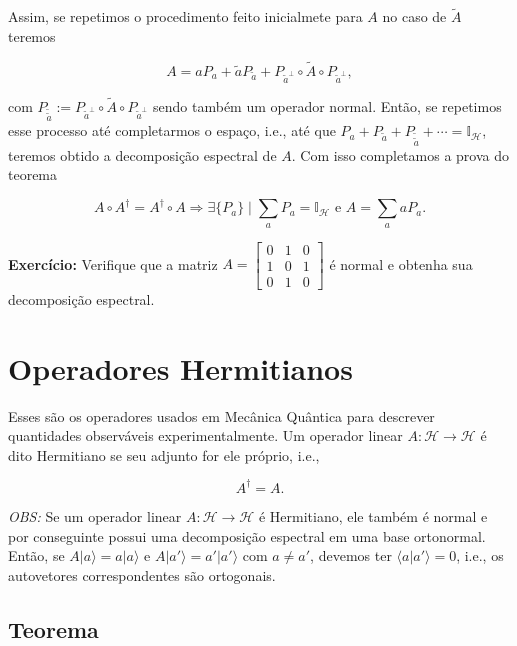 \documentclass[11pt]{article}
\begin{document}
Assim, se repetimos o procedimento feito inicialmete para \(A\) no caso
de \(\tilde{A}\) teremos

\begin{equation}
A = aP_{a} + \tilde{a}P_{\tilde{a}} + P_{\tilde{a}^{\perp}}\circ \tilde{A}\circ P_{\tilde{a}^{\perp}},
\end{equation}

com
\(P_{\tilde{\tilde{a}}}:=P_{\tilde{a}^{\perp}}\circ \tilde{A}\circ P_{\tilde{a}^{\perp}}\)
sendo também um operador normal. Então, se repetimos esse processo até
completarmos o espaço, i.e., até que
\(P_{a}+P_{\tilde{a}}+P_{\tilde{\tilde{a}}}+\cdots=\mathbb{I}_{\mathcal{H}}\),
teremos obtido a decomposição espectral de \(A\). Com isso completamos a
prova do teorema

\begin{equation}
A\circ A^{\dagger}=A^{\dagger}\circ A\Rightarrow \exists{\{P_{a}\}}\mid \sum_{a}P_{a}=\mathbb{I}_{\mathcal{H}}\text{ e }A=\sum_{a}aP_{a}.
\end{equation}

\textbf{Exercício:} Verifique que a matriz
\(A = \begin{bmatrix} 0 & 1 & 0 \\ 1 & 0 & 1 \\ 0 & 1 & 0 \end{bmatrix}\)
é normal e obtenha sua decomposição espectral.

    \section{Operadores Hermitianos}\label{operadores-hermitianos}

Esses são os operadores usados em Mecânica Quântica para descrever
quantidades observáveis experimentalmente. Um operador linear
\(A:\mathcal{H}\rightarrow\mathcal{H}\) é dito Hermitiano se seu adjunto
for ele próprio, i.e.,

\begin{equation}
A^{\dagger}=A.
\end{equation}

\emph{OBS:} Se um operador linear
\(A:\mathcal{H}\rightarrow\mathcal{H}\) é Hermitiano, ele também é
normal e por conseguinte possui uma decomposição espectral em uma base
ortonormal. Então, se \(A|a\rangle=a|a\rangle\) e
\(A|a'\rangle=a'|a'\rangle\) com \(a\ne a'\), devemos ter
\(\langle a|a'\rangle=0\), i.e., os autovetores correspondentes são
ortogonais.

\subsection{Teorema}\label{teorema}
\end{document}

